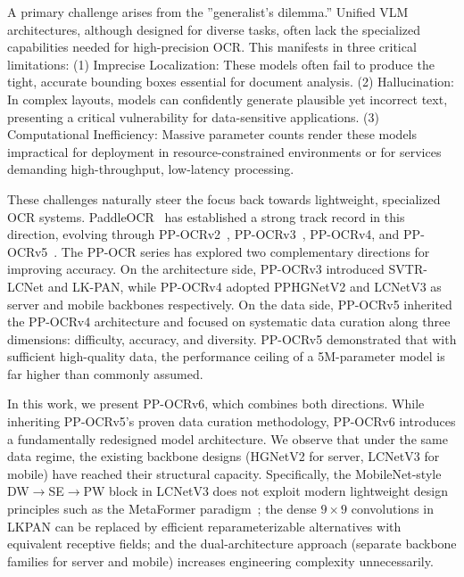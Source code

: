 \documentclass[11pt, a4paper,logo,  copyright, nonumbering]{paddleocr}
\begin{document}
A primary challenge arises from the ''generalist's dilemma.'' Unified VLM architectures, although designed for diverse tasks, often lack the specialized capabilities needed for high-precision OCR. This manifests in three critical limitations: (1) Imprecise Localization: These models often fail to produce the tight, accurate bounding boxes essential for document analysis. (2) Hallucination: In complex layouts, models can confidently generate plausible yet incorrect text, presenting a critical vulnerability for data-sensitive applications. (3) Computational Inefficiency: Massive parameter counts render these models impractical for deployment in resource-constrained environments or for services demanding high-throughput, low-latency processing.

These challenges naturally steer the focus back towards lightweight, specialized OCR systems. PaddleOCR~\cite{du2020pp} has established a strong track record in this direction, evolving through PP-OCRv2~\cite{du2021pp}, PP-OCRv3~\cite{li2022pp}, PP-OCRv4, and PP-OCRv5~\cite{cui2026pp}. The PP-OCR series has explored two complementary directions for improving accuracy. On the architecture side, PP-OCRv3 introduced SVTR-LCNet and LK-PAN, while PP-OCRv4 adopted PPHGNetV2 and LCNetV3 as server and mobile backbones respectively. On the data side, PP-OCRv5 inherited the PP-OCRv4 architecture and focused on systematic data curation along three dimensions: difficulty, accuracy, and diversity. PP-OCRv5 demonstrated that with sufficient high-quality data, the performance ceiling of a 5M-parameter model is far higher than commonly assumed.


In this work, we present PP-OCRv6, which combines both directions. While inheriting PP-OCRv5's proven data curation methodology, PP-OCRv6 introduces a fundamentally redesigned model architecture. We observe that under the same data regime, the existing backbone designs (HGNetV2 for server, LCNetV3 for mobile) have reached their structural capacity. Specifically, the MobileNet-style DW$\to$SE$\to$PW block in LCNetV3 does not exploit modern lightweight design principles such as the MetaFormer paradigm~\cite{yu2022metaformer,wang2024repvit}; the dense $9\times9$ convolutions in LKPAN can be replaced by efficient reparameterizable alternatives with equivalent receptive fields; and the dual-architecture approach (separate backbone families for server and mobile) increases engineering complexity unnecessarily.
\end{document}
